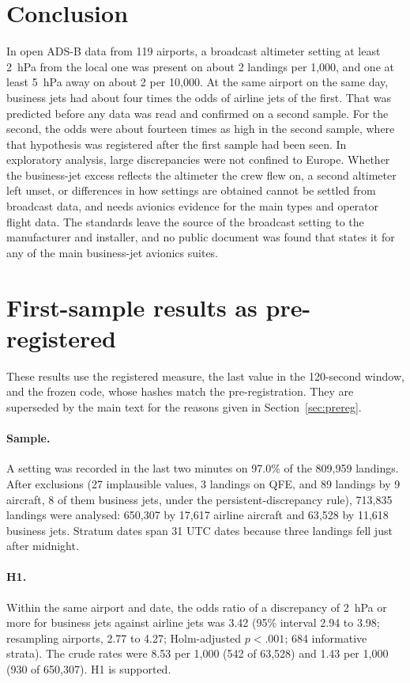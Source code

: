 \documentclass[11pt]{article}
\begin{document}
\section{Conclusion}

In open ADS-B data from 119 airports, a broadcast altimeter setting at least 2~hPa from the local one was present on about 2 landings per 1{,}000, and one at least 5~hPa away on about 2 per 10{,}000. At the same airport on the same day, business jets had about four times the odds of airline jets of the first. That was predicted before any data was read and confirmed on a second sample. For the second, the odds were about fourteen times as high in the second sample, where that hypothesis was registered after the first sample had been seen. In exploratory analysis, large discrepancies were not confined to Europe. Whether the business-jet excess reflects the altimeter the crew flew on, a second altimeter left unset, or differences in how settings are obtained cannot be settled from broadcast data, and needs avionics evidence for the main types and operator flight data. The standards leave the source of the broadcast setting to the manufacturer and installer, and no public document was found that states it for any of the main business-jet avionics suites.

\appendix
\section{First-sample results as pre-registered}\label{app:registered}

These results use the registered measure, the last value in the 120-second window, and the frozen code, whose hashes match the pre-registration. They are superseded by the main text for the reasons given in Section~\ref{sec:prereg}.

\paragraph{Sample.} A setting was recorded in the last two minutes on 97.0\% of the 809{,}959 landings. After exclusions (27 implausible values, 3 landings on QFE, and 89 landings by 9 aircraft, 8 of them business jets, under the persistent-discrepancy rule), 713{,}835 landings were analysed: 650{,}307 by 17{,}617 airline aircraft and 63{,}528 by 11{,}618 business jets. Stratum dates span 31 UTC dates because three landings fell just after midnight.

\paragraph{H1.} Within the same airport and date, the odds ratio of a discrepancy of 2~hPa or more for business jets against airline jets was 3.42 (95\% interval 2.94 to 3.98; resampling airports, 2.77 to 4.27; Holm-adjusted $p < .001$; 684 informative strata). The crude rates were 8.53 per 1{,}000 (542 of 63{,}528) and 1.43 per 1{,}000 (930 of 650{,}307). H1 is supported.
\end{document}

